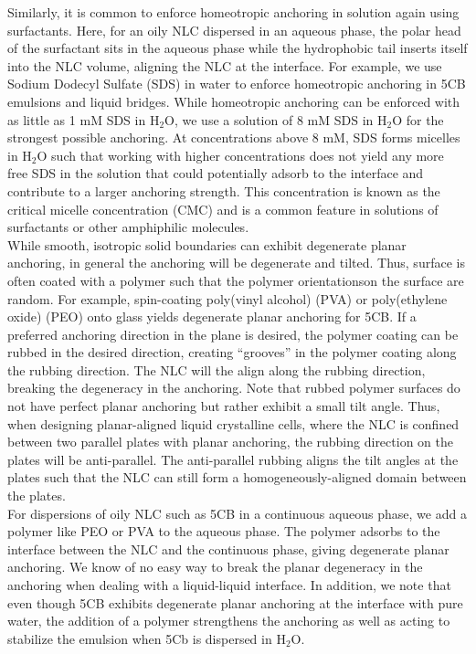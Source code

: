Similarly, it is common to enforce homeotropic anchoring in solution again using surfactants.
Here, for an oily NLC dispersed in an aqueous phase, the polar head of the surfactant sits in the aqueous phase while the hydrophobic tail inserts itself into the NLC volume, aligning the NLC at the interface.
For example, we use Sodium Dodecyl Sulfate (SDS) in water to enforce homeotropic anchoring in 5CB emulsions and liquid bridges.
While homeotropic anchoring can be enforced with as little as 1 mM SDS in H$_2$O, we use a solution of 8 mM SDS in H$_2$O for the strongest possible anchoring.
At concentrations above 8 mM, SDS forms micelles in H$_2$O such that working with higher concentrations does not yield any more free SDS in the solution that could potentially adsorb to the interface and contribute to a larger anchoring strength.
This concentration is known as the critical micelle concentration (CMC) and is a common feature in solutions of surfactants or other amphiphilic molecules. \\

While smooth, isotropic solid boundaries can exhibit degenerate planar anchoring, in general the anchoring will be degenerate and tilted.
Thus, surface is often coated with a polymer such that the polymer orientationson the surface are random.
For example, spin-coating poly(vinyl alcohol) (PVA) or poly(ethylene oxide) (PEO) onto glass yields degenerate planar anchoring for 5CB.
If a preferred anchoring direction in the plane is desired, the polymer coating can be rubbed in the desired direction, creating ``grooves'' in the polymer coating along the rubbing direction.
The NLC will the align along the rubbing direction, breaking the degeneracy in the anchoring.
Note that rubbed polymer surfaces do not have perfect planar anchoring but rather exhibit a small tilt angle.
Thus, when designing planar-aligned liquid crystalline cells, where the NLC is confined between two parallel plates with planar anchoring, the rubbing direction on the plates will be anti-parallel.
The anti-parallel rubbing aligns the tilt angles at the plates such that the NLC can still form a homogeneously-aligned domain between the plates. \\

For dispersions of oily NLC such as 5CB in a continuous aqueous phase, we add a polymer like PEO or PVA to the aqueous phase.
The polymer adsorbs to the interface between the NLC and the continuous phase, giving degenerate planar anchoring.
We know of no easy way to break the planar degeneracy in the anchoring when dealing with a liquid-liquid interface.
In addition, we note that even though 5CB exhibits degenerate planar anchoring at the interface with pure water, the addition of a polymer strengthens the anchoring as well as acting to stabilize the emulsion when 5Cb is dispersed in H$_2$O. \\








